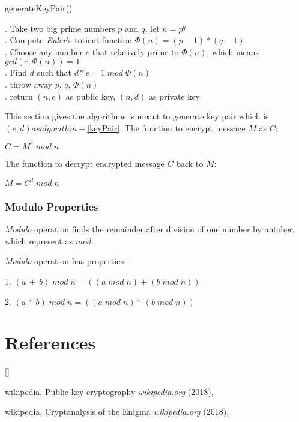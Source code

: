 \documentclass[twoside]{article}
\def\beginrefs{\begin{list}%
        {[\arabic{equation}]}{\usecounter{equation}
         \setlength{\leftmargin}{2.0truecm}\setlength{\labelsep}{0.4truecm}%
         \setlength{\labelwidth}{1.6truecm}}}
\def\endrefs{\end{list}}
\def\bibentry#1{\item[\hbox{[#1]}]}
\begin{document}
\begin{algorithm}[H]
    \caption{generateKeyPair()}
\begin{algorithmic}

    . Take two big prime numbers $p$ and $q$, let $n=p^q$
    \\
    . Compute \textit{Euler}'s totient function $\Phi(n)=(p - 1)\ast(q - 1)$
    \\
    . Choose any number $e$ that relatively prime to $\Phi(n)$, which means
    $gcd(e, \Phi(n)) = 1$
    \\
    . Find $d$ such that $d\ast e = 1\; mod\; \Phi(n)$
    \\
    . throw away $p$, $q$, $\Phi(n)$
    \\
    . return $(n, e)$ as public key, $(n, d)$ as private key
\end{algorithmic}
    \label{keyPair}
\end{algorithm}
This section gives the algorithms is meant to generate key pair which is $(e, d) as algorithm-$\ref{keyPair}.
The function to encrypt message $M$ as $C$:

$C = M^e\; mod\; n$

The function to decrypt encrypted message $C$ back to $M$:

$M = C^d\; mod\; n$

\subsubsection{Modulo Properties}

\textit{Modulo} operation finds the remainder after division of one number by antoher,
which represent as $mod$.

\textit{Modulo} operation has properties:

1. $(a\, +\, b)\; mod\; n = ((a\; mod\; n) + (b\; mod\; n))$

2. $(a\, \ast\, b)\; mod\; n = ((a\; mod\; n) \ast\, (b\; mod\; n))$


\clearpage
\section*{References}
\beginrefs
\bibentry{WikiRSA}{\sc wikipedia},
Public-key cryptography
{\it wikipedia.org} (2018),

\bibentry{WikiEnigma}{\sc wikipedia},
Cryptanalysis of the Enigma
{\it wikipedia.org} (2018),

\endrefs
\end{document}
